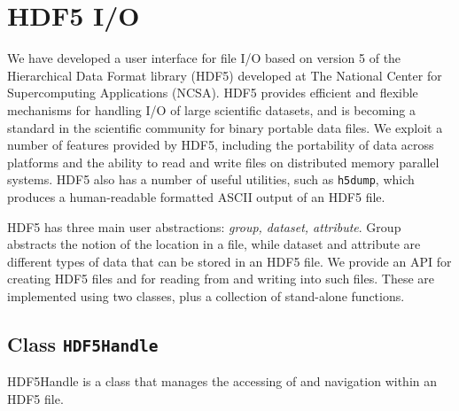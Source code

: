 
\section{HDF5 I/O}

We have developed a user interface for file I/O based on version 5 of
the Hierarchical Data Format library (HDF5) developed at 
The National Center for Supercomputing Applications (NCSA).  HDF5
provides efficient and flexible mechanisms for handling I/O of large
scientific datasets, and is becoming a standard in the
scientific community for binary portable data files. We exploit a number of features provided by 
HDF5, including the portability of data across platforms and the
ability to read and write files on distributed memory parallel systems.
HDF5 also has a number of useful utilities, such as {\tt h5dump}, which
produces a human-readable formatted ASCII output of an HDF5 file. 

HDF5 has three main user abstractions: {\it group, dataset, attribute}.
Group abstracts the notion of the location in a file, while dataset
and attribute are different types of data that can be stored in an HDF5
file. We provide an API for creating HDF5 files and for reading from and
writing into such files. These are implemented using two classes, plus a
collection of stand-alone functions. 

\subsection{Class {\tt HDF5Handle}}

HDF5Handle is a class that manages the accessing of and navigation
within an HDF5 file.

